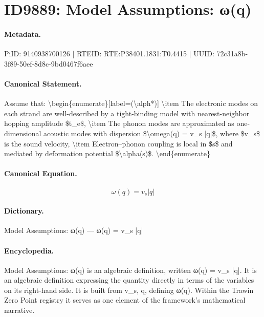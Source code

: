 \section*{ID9889: Model Assumptions: ω(q)}
\paragraph{Metadata.}
PiID: 9140938700126 | RTEID: RTE:P38401.1831:T0.4415 | UUID: 72c31a8b-3f89-50ef-8d8c-9bd0467f6aee

\paragraph{Canonical Statement.}
Assume that: \textbackslash{}begin\{enumerate\}[label=(\textbackslash{}alph*)] \textbackslash{}item The electronic modes on each strand are well-described by a tight-binding model with nearest-neighbor hopping amplitude \$t\_e\$, \textbackslash{}item The phonon modes are approximated as one-dimensional acoustic modes with dispersion \$\textbackslash{}omega(q) = v\_s |q|\$, where \$v\_s\$ is the sound velocity, \textbackslash{}item Electron--phonon coupling is local in \$s\$ and mediated by deformation potential \$\textbackslash{}alpha(s)\$. \textbackslash{}end\{enumerate\}

\paragraph{Canonical Equation.}
\[
\omega(q) = v_s |q|
\]

\paragraph{Dictionary.}
Model Assumptions: ω(q) — ω(q) = v\_s |q|

\paragraph{Encyclopedia.}
Model Assumptions: ω(q) is an algebraic definition, written ω(q) = v\_s |q|. It is an algebraic definition expressing the quantity directly in terms of the variables on its right-hand side. It is built from v\_s, q, defining ω(q). Within the Trawin Zero Point registry it serves as one element of the framework's mathematical narrative.
